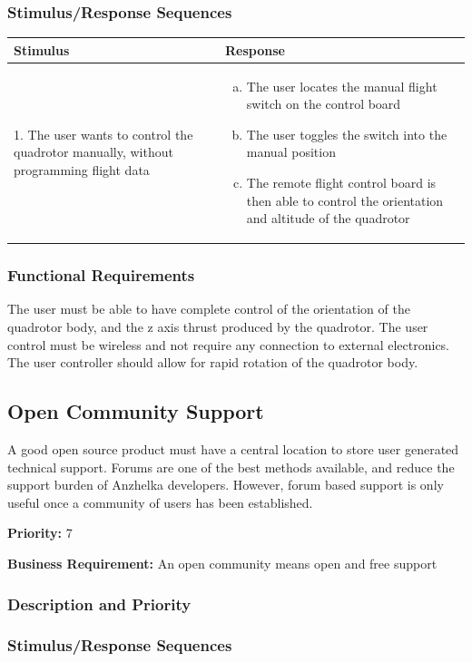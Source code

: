 \documentclass[english]{article}
\numberwithin{equation}{section} %
\begin{document}
\subsubsection{Stimulus/Response Sequences}

\begin{tabular}{p{3cm} | p{8.5cm}}
\hline
\textbf{Stimulus} & \textbf{Response}\\
\hline
1. The user wants to control the quadrotor manually, without programming flight data &
\begin{enumerate}[(a)]\itemsep1pt %
\item The user locates the manual flight switch on the control board
\item The user toggles the switch into the manual position
\item The remote flight control board is then able to control the orientation and altitude of the quadrotor
\end{enumerate}
\\ 
\hline
\end{tabular}
\subsubsection{Functional Requirements}
The user must be able to have complete control of the orientation of the quadrotor body, and the z axis thrust produced by the quadrotor. The user control must be wireless and not require any connection to external electronics. The user controller should allow for rapid rotation of the quadrotor body.

\bigskip

\subsection{Open Community Support}
A good open source product must have a central location to store user generated technical support. Forums are one of the best methods available, and reduce the support burden of Anzhelka developers. However, forum based support is only useful once a community of users has been established.

\textbf{Priority:} 7

\textbf{Business Requirement:} An open community means open and free support
\subsubsection{Description and Priority}
\subsubsection{Stimulus/Response Sequences}
\end{document}

